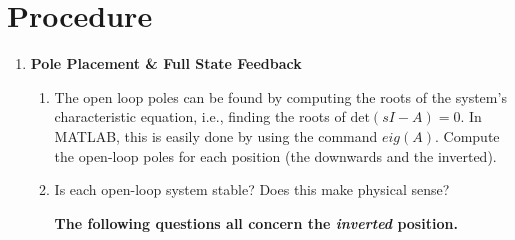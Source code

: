 \section{Procedure}
\begin{enumerate}
    \item \textbf{Pole Placement \& Full State Feedback}\label{section:lab3_feedback}
          \begin{enumerate}
              \item The open loop poles can be found by computing the roots of the system's characteristic equation, i.e., finding the roots of \( \text{det}(sI-A)=0 \). In MATLAB, this is easily done by using the command \( eig(A) \). Compute the open-loop poles for each position (the downwards and the inverted).
              \item Is each open-loop system stable? Does this make physical sense?


                    \textbf{The following questions all concern the \emph{inverted} position.}


\end{enumerate}
\end{enumerate}
